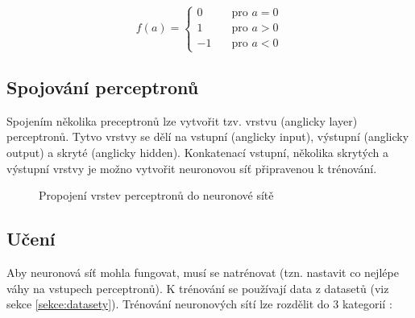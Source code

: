 \begin{equation}
  \label{vzorec:vystup_aktivacni_fce}
   f(a) =
    \begin{cases}
      0       & \quad \text{pro } a = 0\\
      1       & \quad \text{pro } a > 0\\
      -1       & \quad \text{pro } a < 0
    \end{cases}
\end{equation}

\subsection*{Spojování perceptronů}
Spojením několika preceptronů lze vytvořit tzv. vrstvu (anglicky layer) perceptronů. Tytvo vrstvy se dělí na vstupní (anglicky input), výstupní (anglicky output) a skryté (anglicky hidden). Konkatenací vstupní, několika skrytých a výstupní vrstvy je možno vytvořit neuronovou síť připravenou k trénování.

\begin{figure}[H]
  \begin{center}
  \label{obrazek:nsexample}
  \caption{Propojení vrstev perceptronů do neuronové sítě}
  \end{center}
\end{figure}

\subsection*{Učení}
Aby neuronová síť mohla fungovat, musí se natrénovat (tzn. nastavit co nejlépe váhy na vstupech perceptronů). K trénování se používají data z datasetů (viz sekce \ref{sekce:datasety}). Trénování neuronových sítí lze rozdělit do 3 kategorií \cite{deeplearningbook}:

